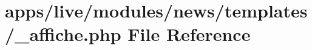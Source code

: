 \hypertarget{live_2modules_2news_2templates_2__affiche_8php}{\section{apps/live/modules/news/templates/\-\_\-affiche.php File Reference}
\label{live_2modules_2news_2templates_2__affiche_8php}
}
